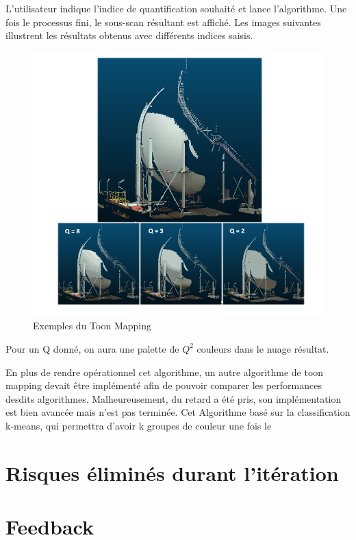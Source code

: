 \documentclass[12pt,titlepage,french]{article}
\begin{document}
L'utilisateur indique l'indice de quantification souhaité et lance l'algorithme. Une fois le processus fini, le sous-scan résultant est affiché. Les images suivantes illustrent les résultats obtenus avec différents indices saisis.
\begin{figure}[H]
 \caption{\label{} Exemples du Toon Mapping}
 \begin{center}
 \includegraphics[width=1\textwidth]{./img/ExpToonMapping.PNG}
  \end{center}
\end{figure}
Pour un Q donné, on aura une palette de $Q^2$ couleurs dans le nuage résultat.\newline

En plus de rendre opérationnel cet algorithme, un autre algorithme de toon mapping devait être implémenté afin de pouvoir comparer les performances desdits algorithmes. Malheureusement, du retard a été pris, son implémentation est bien avancée mais n'est pas terminée. Cet Algorithme basé sur la classification k-means, qui permettra d'avoir k groupes de couleur une fois le

\section{Risques éliminés durant l'itération}


\section{Feedback}
\end{document}
